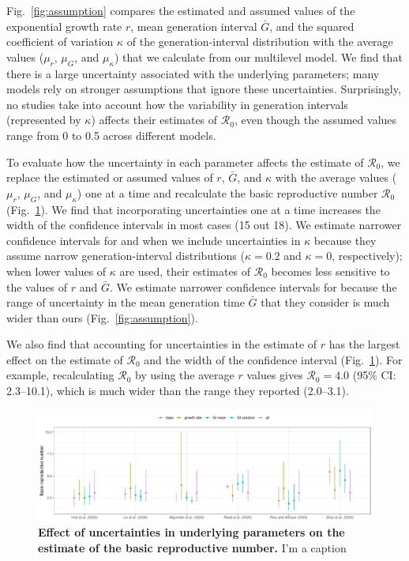 \documentclass[12pt]{article}
\newcommand{\fref}[1]{Fig.~\ref{fig:#1}}
\begin{document}
\fref{assumption} compares the estimated and assumed values of the exponential growth rate $r$, mean generation interval $\bar G$, and the squared coefficient of variation $\kappa$ of the generation-interval distribution with the average values ($\mu_r$, $\mu_G$, and $\mu_\kappa$) that we calculate from our multilevel model.
We find that there is a large uncertainty associated with the underlying parameters;
many models rely on stronger assumptions that ignore these uncertainties.
Surprisingly, no studies take into account how the variability in generation intervals (represented by $\kappa$) affects their estimates of $\mathcal R_0$, even though the assumed values range from 0 to 0.5 across different models.

To evaluate how the uncertainty in each parameter affects the estimate of $\mathcal R_0$,
we replace the estimated or assumed values of $r$, $\bar G$, and $\kappa$ with the average values ($\mu_r$, $\mu_G$, and $\mu_\kappa$) one at a time and recalculate the basic reproductive number $\mathcal R_0$ (\fref{R0}).
We find that incorporating uncertainties one at a time increases the width of the confidence intervals in most cases (15 out 18).
We estimate  narrower confidence intervals for \cite{liuncov} and \cite{majumderncov} when we include uncertainties in $\kappa$ because they assume narrow generation-interval distributions ($\kappa = 0.2$ and $\kappa=0$, respectively);
when lower values of $\kappa$ are used, their estimates of $\mathcal R_0$ becomes less sensitive to the values of $r$ and $\bar G$.
We estimate narrower confidence intervals for \citep{riouncov} because the range of uncertainty in the mean generation time $\bar G$ that they consider is much wider than ours (\fref{assumption}).

We also find that accounting for uncertainties in the estimate of $r$ has the largest effect on the estimate of $\mathcal R_0$ and the width of the confidence interval (\fref{R0}).
For example, recalculating $\mathcal R_0$ by \cite{majumderncov} using the average $r$ values gives $\mathcal R_0 = 4.0$ (95\% CI: 2.3--10.1), which is much wider than the range they reported (2.0--3.1).



\begin{figure}[t]
\includegraphics[width=\textwidth]{compare_R0.pdf}
\caption{
\textbf{Effect of uncertainties in underlying parameters on the estimate of the basic reproductive number.}
I'm a caption
}
\label{fig:R0}
\end{figure}


\pagebreak


\end{document}

